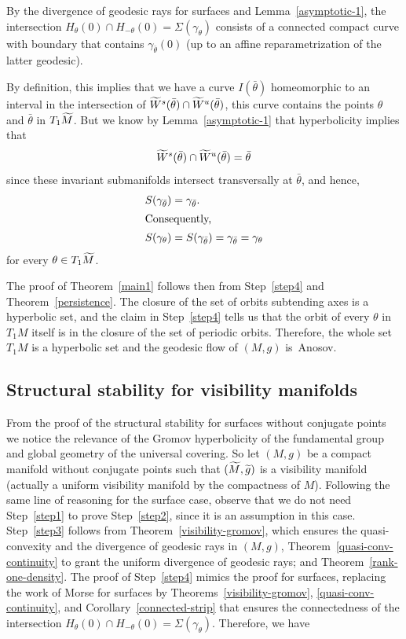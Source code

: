 \documentclass[10pt]{amsart}
\theoremstyle{definition}
\let\oldtilde\tilde
\renewcommand*{\tilde}[1]{\mathchoice{\widetilde{#1}}{\widetilde{#1}}{\oldtilde{#1}}{\oldtilde{#1}}}
\begin{document}
By the divergence of geodesic rays for surfaces and Lemma~\ref{asymptotic-1}, the intersection $H_{\theta}(0) \cap H_{-\theta}(0) = \Sigma(\gamma_{\theta})$ consists of a connected compact curve with boundary that contains $\gamma_{\bar{\theta}}(0)$ (up to an affine reparametrization of the latter geodesic).

By definition, this implies that we have a curve $I(\bar{\theta})$ homeomorphic to an interval in the intersection of $\tilde{W}^{s}(\bar{\theta})\cap \tilde{W}^{u}(\bar{\theta})$, this curve contains the points $\theta$ and $\bar{\theta}$ in $T_{1}\tilde{M}$. But we know by Lemma~\ref{asymptotic-1} that hyperbolicity implies that
\[
\tilde{W}^{s}(\bar{\theta})\cap \tilde{W}^{u}(\bar{\theta}) = \bar{\theta}
\]
since these invariant submanifolds intersect transversally at $\bar{\theta}$, and hence,
\begin{align*}
S(\gamma_{\bar{\theta}}) &= \gamma_{\bar{\theta}}.
\\
\intertext{Consequently,}
S(\gamma_{\theta}) &= S(\gamma_{\bar{\theta}}) = \gamma_{\bar{\theta}} = \gamma_{\theta}
\end{align*}
for every $\theta \in T_{1}\tilde{M}$.

The proof of Theorem~\ref{main1} follows then from Step~\ref{step4} and Theorem~\ref{persistence}. The closure of the set of orbits subtending axes is a hyperbolic set, and the claim in Step~\ref{step4} tells us that the orbit of every $\theta $ in $T_{1}M$ itself is in the closure of the set of periodic orbits. Therefore, the whole set $T_{1}M$ is a hyperbolic set and the geodesic flow of $(M,g)$ is~Anosov.

\subsection{Structural stability for visibility manifolds}

From the proof of the structural stability for surfaces without conjugate points we notice the relevance of the Gromov hyperbolicity of the fundamental group and global geometry of the universal covering.
So let $(M,g)$ be a compact manifold without conjugate points such that $(\tilde{M}, \tilde{g})$ is a visibility manifold (actually a uniform visibility manifold by the compactness of $M$). Following the same line of reasoning for the surface case, observe that we do not need Step~\ref{step1} to prove Step~\ref{step2}, since it is an assumption in this case. Step~\ref{step3} follows from Theorem~\ref{visibility-gromov}, which ensures the quasi-convexity and the divergence of geodesic rays in $(M,g)$, Theorem~\ref{quasi-conv-continuity} to grant the uniform divergence of geodesic rays; and Theorem~\ref{rank-one-density}. The proof of Step~\ref{step4} mimics the proof for surfaces, replacing the work of Morse for surfaces by Theorems~\ref{visibility-gromov}, \ref{quasi-conv-continuity}, and Corollary~\ref{connected-strip} that ensures the connectedness of the intersection $H_{\theta}(0) \cap H_{-\theta}(0) =
\Sigma(\gamma_{\theta})$. Therefore, we have
\end{document}
